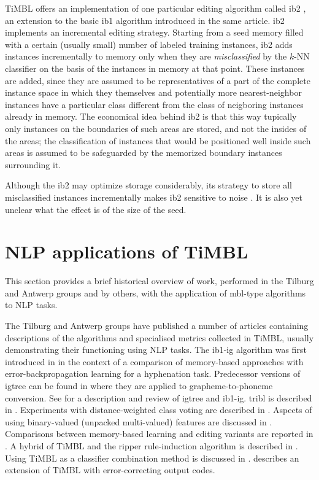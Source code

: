 \documentclass{report}
\begin{document}
TiMBL offers an implementation of one particular editing algorithm
called {\sc ib2} \cite{Aha+91}, an extension to the basic {\sc ib1}
algorithm introduced in the same article. {\sc ib2} implements an
incremental editing strategy. Starting from a seed memory filled with
a certain (usually small) number of labeled training instances, {\sc
ib2} adds instances incrementally to memory only when they are {\em
misclassified}\/ by the $k$-NN classifier on the basis of the
instances in memory at that point. These instances are added, since
they are assumed to be representatives of a part of the complete
instance space in which they themselves and potentially more
nearest-neighbor instances have a particular class different from the
class of neigboring instances already in memory. The economical idea
behind {\sc ib2} is that this way tupically only instances on the
boundaries of such areas are stored, and not the insides of the areas;
the classification of instances that would be positioned well inside
such areas is assumed to be safeguarded by the memorized boundary
instances surrounding it.

Although the {\sc ib2} may optimize storage
considerably, its strategy to store all misclassified instances
incrementally makes {\sc ib2} sensitive to noise \cite{Aha+91}. It is
also yet unclear what the effect is of the size of the seed.

\section{NLP applications of TiMBL}
\label{furtherreading}

This section provides a brief historical overview of work, performed
in the Tilburg and Antwerp groups and by others, with the application
of {\sc mbl}-type algorithms to NLP tasks.

The Tilburg and Antwerp groups have published a number of articles
containing descriptions of the algorithms and specialised metrics
collected in TiMBL, usually demonstrating their functioning using NLP
tasks. The {\sc ib1-ig} algorithm was first introduced in
\cite{Daelemans+92b} in the context of a comparison of memory-based
approaches with error-back\-propagation learning for a hyphenation
task.  Predecessor versions of {\sc igtree} can be found in
\cite{Daelemans+93c,VandenBosch+93} where they are applied to
grapheme-to-phoneme conversion.  See \cite{Daelemans+97} for a
description and review of {\sc igtree} and {\sc ib1-ig}. {\sc tribl}
is described in \cite{Daelemans+97d}.  Experiments with
distance-weighted class voting are described in
\cite{Zavrel97}. Aspects of using binary-valued (unpacked
multi-valued) features are discussed in \cite{VandenBosch+00}.
Comparisons between memory-based learning and editing variants are
reported in \cite{VandenBosch99,Daelemans+99}. A hybrid of TiMBL and
the {\sc ripper} rule-induction algorithm \cite{Cohen95} is described
in \cite{VandenBosch00}. Using TiMBL as a classifier combination
method is discussed in \cite{Halteren+01}. 
describes an extension of TiMBL with error-correcting output codes.
\end{document}
